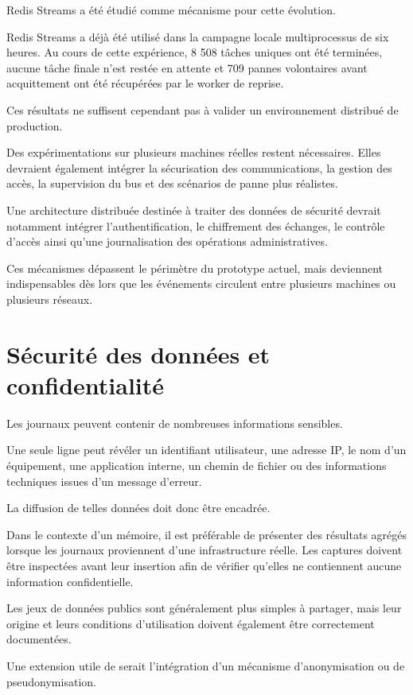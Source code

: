 Redis Streams a été étudié comme mécanisme pour cette évolution.

Redis Streams a déjà été utilisé dans la campagne locale multiprocessus de six heures. Au cours de cette expérience, 8 508 tâches uniques ont été terminées, aucune tâche finale n'est restée en attente et 709 pannes volontaires avant acquittement ont été récupérées par le worker de reprise.

Ces résultats ne suffisent cependant pas à valider un environnement distribué de production.

Des expérimentations sur plusieurs machines réelles restent nécessaires. Elles devraient également intégrer la sécurisation des communications, la gestion des accès, la supervision du bus et des scénarios de panne plus réalistes.

Une architecture distribuée destinée à traiter des données de sécurité devrait notamment intégrer l'authentification, le chiffrement des échanges, le contrôle d'accès ainsi qu'une journalisation des opérations administratives.

Ces mécanismes dépassent le périmètre du prototype actuel, mais deviennent indispensables dès lors que les événements circulent entre plusieurs machines ou plusieurs réseaux.

\section{Sécurité des données et confidentialité}

Les journaux peuvent contenir de nombreuses informations sensibles.

Une seule ligne peut révéler un identifiant utilisateur, une adresse IP, le nom d'un équipement, une application interne, un chemin de fichier ou des informations techniques issues d'un message d'erreur.

La diffusion de telles données doit donc être encadrée.

Dans le contexte d'un mémoire, il est préférable de présenter des résultats agrégés lorsque les journaux proviennent d'une infrastructure réelle. Les captures doivent être inspectées avant leur insertion afin de vérifier qu'elles ne contiennent aucune information confidentielle.

Les jeux de données publics sont généralement plus simples à partager, mais leur origine et leurs conditions d'utilisation doivent également être correctement documentées.

Une extension utile de \logminer{} serait l'intégration d'un mécanisme d'anonymisation ou de pseudonymisation.


